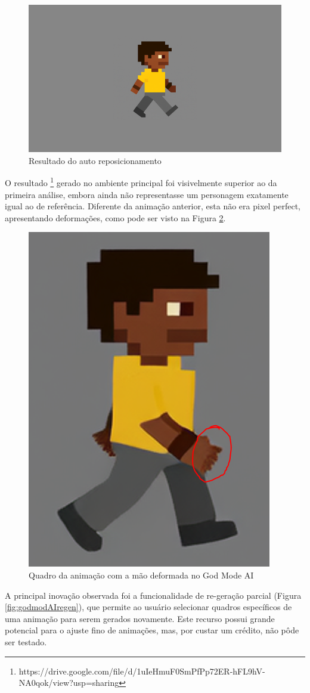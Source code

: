 \begin{figure}[htbp]
    \centering
    \caption{\small Resultado do auto reposicionamento}
    \label{fig:godmodAIreposeFinal}
    \includegraphics[width=0.5\linewidth]{figs/godmodAI/resultadoRepose.png}
\end{figure}

O resultado \footnote{https://drive.google.com/file/d/1uIeHmuF0SmPfPp72ER-hFL9hV-NA0qok/view?usp=sharing} gerado no ambiente principal foi visivelmente superior ao da primeira análise, embora ainda não representasse um personagem exatamente igual ao de referência. Diferente da animação anterior, esta não era pixel perfect, apresentando deformações, como pode ser visto na Figura \ref{fig:godmodAImao}.

\begin{figure}[htbp]
    \centering
    \caption{\small Quadro da animação com a mão deformada no God Mode AI}
    \label{fig:godmodAImao}
    \includegraphics[width=0.3\linewidth]{figs/godmodAI/maoDeformada.PNG}
\end{figure}

A principal inovação observada foi a funcionalidade de re-geração parcial (Figura \ref{fig:godmodAIregen}), que permite ao usuário selecionar quadros específicos de uma animação para serem gerados novamente. Este recurso possui grande potencial para o ajuste fino de animações, mas, por custar um crédito, não pôde ser testado.

